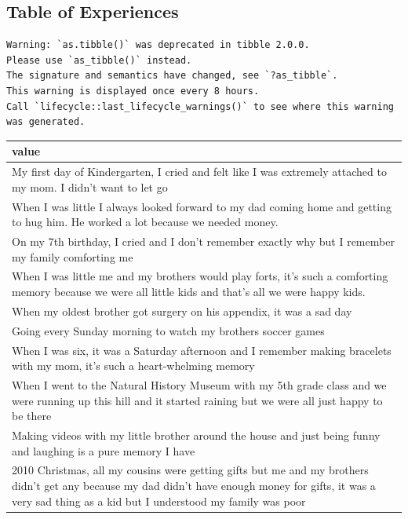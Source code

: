 \documentclass[
  .7em,
  letterpaper,
  DIV=11,
  numbers=noendperiod]{scrartcl}
\begin{document}
\hypertarget{table-of-experiences}{%
\subsection{Table of Experiences}\label{table-of-experiences}}

\begin{verbatim}
Warning: `as.tibble()` was deprecated in tibble 2.0.0.
Please use `as_tibble()` instead.
The signature and semantics have changed, see `?as_tibble`.
This warning is displayed once every 8 hours.
Call `lifecycle::last_lifecycle_warnings()` to see where this warning was generated.
\end{verbatim}

\begin{table}
\centering
\begin{tabular}{l}
\hline
value\\
\hline
My first day of Kindergarten, I cried and felt like I was extremely attached to my mom. I didn't want to let go\\
\hline
When I was little I always looked forward to my dad coming home and getting to hug him. He worked a lot because we needed money.\\
\hline
On my 7th birthday, I cried and I don't remember exactly why but I remember my family comforting me\\
\hline
When I was little me and my brothers would play forts, it's such a comforting memory because we were all little kids and that's all we were happy kids.\\
\hline
When my oldest brother got surgery on his appendix, it was a sad day\\
\hline
Going every Sunday morning to watch my brothers soccer games\\
\hline
When I was six, it was a Saturday afternoon and I remember making bracelets with my mom, it's such a heart-whelming memory\\
\hline
When I went to the Natural History Museum with my 5th grade class and we were running up this hill and it started raining but we were all just happy to be there\\
\hline
Making videos with my little brother around the house and just being funny and laughing is a pure memory I have\\
\hline
2010 Christmas, all my cousins were getting gifts but me and my brothers didn't get any because my dad didn't have enough money for gifts, it was a very sad thing as a kid but I understood my family was poor\\

\end{tabular}
\end{table}
\end{document}
